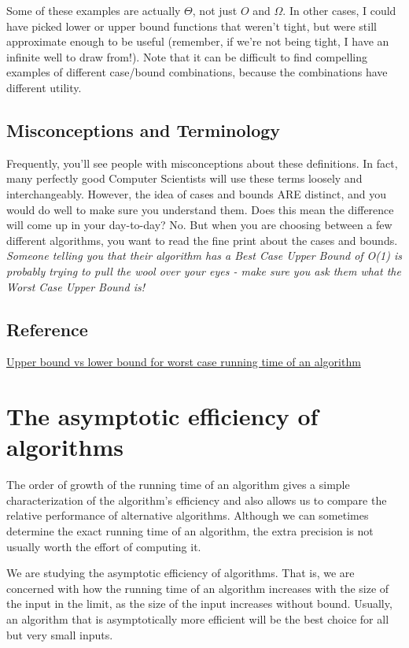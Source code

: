 \documentclass[en,hazy,blue,screen,14pt]{elegantnote}
\begin{document}
Some of these examples are actually $\Theta$, not just $O$ and $\Omega$.
In other cases, I could have picked lower or upper bound functions
that weren't tight, but were still approximate enough to be useful
(remember, if we're not being tight, I have an infinite well to draw
from!). Note that it can be difficult to find compelling examples
of different case/bound combinations, because the combinations have
different utility.

\subsection{Misconceptions and Terminology} 

Frequently, you'll see people with misconceptions about these definitions.
In fact, many perfectly good Computer Scientists will use these terms
loosely and interchangeably. However, the idea of cases and bounds
ARE distinct, and you would do well to make sure you understand them.
Does this mean the difference will come up in your day-to-day? No.
But when you are choosing between a few different algorithms, you
want to read the fine print about the cases and bounds. \emph{Someone
telling you that their algorithm has a Best Case Upper Bound of O(1)
is probably trying to pull the wool over your eyes - make sure you
ask them what the Worst Case Upper Bound is!}

\subsection{Reference}

\href{https://stackoverflow.com/questions/7628991/upper-bound-vs-lower-bound-for-worst-case-running-time-of-an-algorithm}{Upper bound vs lower bound for worst case running time of an algorithm}

\newpage

\section{The asymptotic efficiency of algorithms}

The order of growth of the running time of an algorithm gives a simple
characterization of the algorithm\textquoteright s efficiency and
also allows us to compare the relative performance of alternative
algorithms. Although we can sometimes determine the exact running
time of an algorithm, the extra precision is not usually worth the
effort of computing it. 

We are studying the asymptotic efficiency of algorithms. That is,
we are concerned with how the running time of an algorithm increases
with the size of the input in the limit, as the size of the input
increases without bound. Usually, an algorithm that is asymptotically
more efficient will be the best choice for all but very small inputs.
\end{document}

